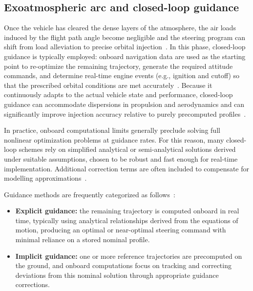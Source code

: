 \subsection{Exoatmospheric arc and closed-loop guidance}

Once the vehicle has cleared the dense layers of the atmosphere, the air loads induced by the flight path angle become negligible and the steering program can shift from load alleviation to precise orbital injection~\cite{Edberg}. In this phase, closed-loop guidance is typically employed: onboard navigation data are used as the starting point to re-optimize the remaining trajectory, generate the required attitude commands, and determine real-time engine events (e.g., ignition and cutoff) so that the prescribed orbital conditions are met accurately~\cite{tewari2011advanced}.
Because it continuously adapts to the actual vehicle state and performance, closed-loop guidance can accommodate dispersions in propulsion and aerodynamics and can significantly improve injection accuracy relative to purely precomputed profiles~\cite{SongZhaoTheil2023AutonomousTrajectory}.


In practice, onboard computational limits generally preclude solving full nonlinear optimization problems at guidance rates. For this reason, many closed-loop schemes rely on simplified analytical or semi-analytical solutions derived under suitable assumptions, chosen to be robust and fast enough for real-time implementation. Additional correction terms are often included to compensate for modelling approximations~\cite{BettsSurvey1998}.

Guidance methods are frequently categorized as follows~\cite{suresh2015integrated}:
\begin{itemize}
  \item \textbf{Explicit guidance:} the remaining trajectory is computed onboard in real time, typically using analytical relationships derived from the equations of motion, producing an optimal or near-optimal steering command with minimal reliance on a stored nominal profile.
  \item \textbf{Implicit guidance:} one or more reference trajectories are precomputed on the ground, and onboard computations focus on tracking and correcting deviations from this nominal solution through appropriate guidance corrections.
\end{itemize}

